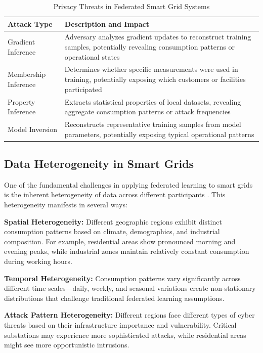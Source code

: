 \documentclass{ieeeaccess}
\theoremstyle{definition}
\begin{document}
\begin{table}[htbp]
\caption{Privacy Threats in Federated Smart Grid Systems}
\label{tab:threats}
\centering
\begin{tabular}{p{2.5cm}p{5cm}}
\toprule
Attack Type & Description and Impact \\
\midrule
Gradient Inference & Adversary analyzes gradient updates to reconstruct training samples, potentially revealing consumption patterns or operational states \\
\midrule
Membership Inference & Determines whether specific measurements were used in training, potentially exposing which customers or facilities participated \\
\midrule
Property Inference & Extracts statistical properties of local datasets, revealing aggregate consumption patterns or attack frequencies \\
\midrule
Model Inversion & Reconstructs representative training samples from model parameters, potentially exposing typical operational patterns \\
\bottomrule
\end{tabular}
\end{table}

\subsection{Data Heterogeneity in Smart Grids}

One of the fundamental challenges in applying federated learning to smart grids is the inherent heterogeneity of data across different participants \cite{li2025federated, samek2025intelligent}. This heterogeneity manifests in several ways:

\textbf{Spatial Heterogeneity:} Different geographic regions exhibit distinct consumption patterns based on climate, demographics, and industrial composition. For example, residential areas show pronounced morning and evening peaks, while industrial zones maintain relatively constant consumption during working hours.

\textbf{Temporal Heterogeneity:} Consumption patterns vary significantly across different time scales—daily, weekly, and seasonal variations create non-stationary distributions that challenge traditional federated learning assumptions.

\textbf{Attack Pattern Heterogeneity:} Different regions face different types of cyber threats based on their infrastructure importance and vulnerability. Critical substations may experience more sophisticated attacks, while residential areas might see more opportunistic intrusions.
\end{document}
